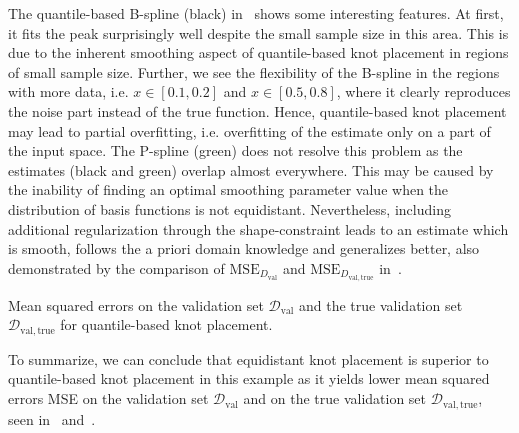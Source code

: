 The quantile-based B-spline (black) in~ shows some interesting features. At first, it fits the peak surprisingly well despite the small sample size in this area. This is due to the inherent smoothing aspect of quantile-based knot placement in regions of small sample size. Further, we see the flexibility of the B-spline in the regions with more data, i.e. $x\in[0.1,0.2]$ and $x \in [0.5,0.8]$, where it clearly reproduces the noise part instead of the true function. Hence, quantile-based knot placement may lead to partial overfitting, i.e. overfitting of the estimate only on a part of the input space. The P-spline (green) does not resolve this problem as the estimates (black and green) overlap almost everywhere. This may be caused by the inability of finding an optimal smoothing parameter value when the distribution of basis functions is not equidistant. Nevertheless, including additional regularization through the shape-constraint leads to an estimate which is smooth, follows the a priori domain knowledge and generalizes better, also demonstrated by the comparison of $\text{MSE}_{D_{\mathrm{val}}}$ and $\text{MSE}_{D_{\mathrm{val}, \mathrm{true}}}$ in~.


\begin{table}[H]
	\begin{center}
	\end{center}
	\caption{Mean squared errors on the validation set $\mathcal{D}_{\mathrm{val}}$ and the true validation set $\mathcal{D}_{\mathrm{val},\mathrm{true}}$ for quantile-based knot placement.}
	\label{tab:sparse-example-quantile}
\end{table}
%
To summarize, we can conclude that equidistant knot placement is superior to quantile-based knot placement in this example as it yields lower mean squared errors MSE on the validation set $\mathcal{D}_{\mathrm{val}}$ and on the true validation set $\mathcal{D}_{\mathrm{val}, \mathrm{true}}$, seen in~ and~.

